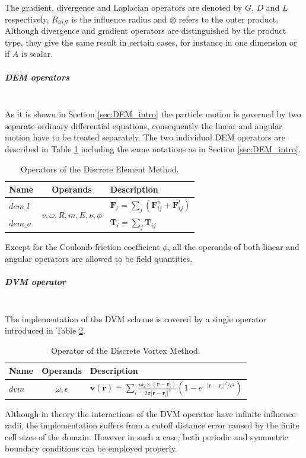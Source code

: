 \documentclass[a4paper,12pt,openany]{book}
\newcommand{\mysubparagraph}[1]{\subparagraph{#1}\mbox{}\\}
\theoremstyle{break}
\begin{document}
The gradient, divergence and Laplacian operators are denoted by $G$, $D$ and $L$ respectively, $R_{infl}$ is the influence radius and $\otimes$ refers to the outer product. Although divergence and gradient operators are distinguished by the product type, they give the same result in certain cases, for instance in one dimension or if $A$ is scalar.

\mysubparagraph{DEM operators}
As it is shown in Section \ref{sec:DEM_intro} the particle motion is governed by two separate ordinary differential equations, consequently the linear and angular motion have to be treated separately. The two individual DEM operators are described in Table \ref{tbl:DEM_ops} including the same notations as in Section \ref{sec:DEM_intro}.
\begin{table} [h!]
\begin{center}
\caption{Operators of the Discrete Element Method.} \label{tbl:DEM_ops}
\begin{tabular}{ l c l }
\toprule[1.5pt]
\bf Name & \bf Operands & \bf Description \\ 
\midrule
$dem\_l$ & \multirow{2}{*}{$v, \omega, R, m, E, \nu, \phi$} & $\textbf{F}_i=\sum_{j}{\left(\textbf{F}^n_{ij}+\textbf{F}^t_{ij}\right)}$ \\ 
$dem\_a$ &  & $\textbf{T}_i=\sum_{j}{\textbf{T}_{ij}}$ \\ 
\bottomrule[1.25pt]
\end{tabular}
\end{center}
\end{table}
Except for the Coulomb-friction coefficient $\phi$, all the operands of both linear and angular operators are allowed to be field quantities.


\mysubparagraph{DVM operator}
The implementation of the DVM scheme is covered by a single operator introduced in Table \ref{tbl:DVM_op}. 
\begin{table} [h!]
\begin{center}
\caption{Operator of the Discrete Vortex Method.} \label{tbl:DVM_op}
\begin{tabular}{ l c l }
\toprule[1.5pt]
\bf Name & \bf Operands & \bf Description \\ 
\midrule
$dvm$ & $\omega, \epsilon$ & $\textbf{v}(\textbf{r})=\sum_i\frac{\bm{\omega}_i\times (\textbf{r}-\textbf{r}_i)}{2\pi \vert\textbf{r}-\textbf{r}_i\vert^2}(1-e^{-\vert\textbf{r}-\textbf{r}_i\vert^2/\epsilon^2})$ \\
\bottomrule[1.25pt]
\end{tabular}
\end{center}
\end{table}
Although in theory the interactions of the DVM operator have infinite influence radii, the implementation suffers from a cutoff distance error caused by the finite cell sizes of the domain. However in such a case, both periodic and symmetric boundary conditions can be employed properly.
\end{document}
